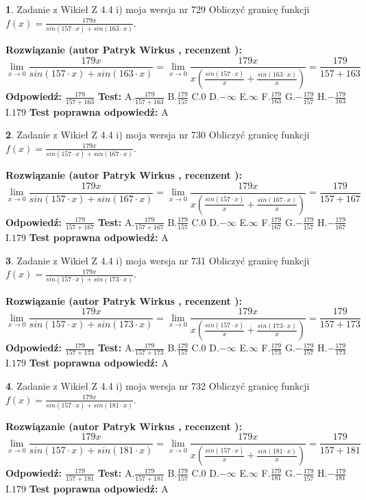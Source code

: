 \documentclass[12pt, a4paper]{article}
\theoremstyle{definition} %
\newtheorem{zad}{}
\newcommand{\zadStart}[1]{\begin{zad}#1\newline}
\newcommand{\zadStop}{\end{zad}}
\newcommand{\rozwStart}[2]{\noindent \textbf{Rozwiązanie (autor #1 , recenzent #2): }\newline}
\newcommand{\rozwStop}{\newline}
\newcommand{\odpStart}{\noindent \textbf{Odpowiedź:}\newline}
\newcommand{\odpStop}{\newline}
\newcommand{\testStart}{\noindent \textbf{Test:}\newline}
\newcommand{\testStop}{\newline}
\newcommand{\kluczStart}{\noindent \textbf{Test poprawna odpowiedź:}\newline}
\newcommand{\kluczStop}{\newline}
\begin{document}
\zadStart{Zadanie z Wikieł Z 4.4 i) moja wersja nr 729}
Obliczyć granicę funkcji $f(x)=\frac{179x}{sin(157\cdot x) +sin(163\cdot x)}$.
\zadStop
\rozwStart{Patryk Wirkus}{}
$$\lim\limits_{x\to 0}\frac{179x}{sin(157\cdot x) +sin(163\cdot x)}=\lim\limits_{x\to 0}\frac{179x}{x(\frac{sin(157\cdot x)}{x}+\frac{sin(163\cdot x)}{x})}=\frac{179}{157+163}$$
\rozwStop
\odpStart
$\frac{179}{157+163}$
\odpStop
\testStart
A.$\frac{179}{157+163}$
B.$\frac{179}{157}$
C.$0$
D.$-\infty$
E.$\infty$
F.$\frac{179}{163}$
G.$-\frac{179}{157}$
H.$-\frac{179}{163}$
I.$179$
\testStop
\kluczStart
A
\kluczStop



\zadStart{Zadanie z Wikieł Z 4.4 i) moja wersja nr 730}
Obliczyć granicę funkcji $f(x)=\frac{179x}{sin(157\cdot x) +sin(167\cdot x)}$.
\zadStop
\rozwStart{Patryk Wirkus}{}
$$\lim\limits_{x\to 0}\frac{179x}{sin(157\cdot x) +sin(167\cdot x)}=\lim\limits_{x\to 0}\frac{179x}{x(\frac{sin(157\cdot x)}{x}+\frac{sin(167\cdot x)}{x})}=\frac{179}{157+167}$$
\rozwStop
\odpStart
$\frac{179}{157+167}$
\odpStop
\testStart
A.$\frac{179}{157+167}$
B.$\frac{179}{157}$
C.$0$
D.$-\infty$
E.$\infty$
F.$\frac{179}{167}$
G.$-\frac{179}{157}$
H.$-\frac{179}{167}$
I.$179$
\testStop
\kluczStart
A
\kluczStop



\zadStart{Zadanie z Wikieł Z 4.4 i) moja wersja nr 731}
Obliczyć granicę funkcji $f(x)=\frac{179x}{sin(157\cdot x) +sin(173\cdot x)}$.
\zadStop
\rozwStart{Patryk Wirkus}{}
$$\lim\limits_{x\to 0}\frac{179x}{sin(157\cdot x) +sin(173\cdot x)}=\lim\limits_{x\to 0}\frac{179x}{x(\frac{sin(157\cdot x)}{x}+\frac{sin(173\cdot x)}{x})}=\frac{179}{157+173}$$
\rozwStop
\odpStart
$\frac{179}{157+173}$
\odpStop
\testStart
A.$\frac{179}{157+173}$
B.$\frac{179}{157}$
C.$0$
D.$-\infty$
E.$\infty$
F.$\frac{179}{173}$
G.$-\frac{179}{157}$
H.$-\frac{179}{173}$
I.$179$
\testStop
\kluczStart
A
\kluczStop



\zadStart{Zadanie z Wikieł Z 4.4 i) moja wersja nr 732}
Obliczyć granicę funkcji $f(x)=\frac{179x}{sin(157\cdot x) +sin(181\cdot x)}$.
\zadStop
\rozwStart{Patryk Wirkus}{}
$$\lim\limits_{x\to 0}\frac{179x}{sin(157\cdot x) +sin(181\cdot x)}=\lim\limits_{x\to 0}\frac{179x}{x(\frac{sin(157\cdot x)}{x}+\frac{sin(181\cdot x)}{x})}=\frac{179}{157+181}$$
\rozwStop
\odpStart
$\frac{179}{157+181}$
\odpStop
\testStart
A.$\frac{179}{157+181}$
B.$\frac{179}{157}$
C.$0$
D.$-\infty$
E.$\infty$
F.$\frac{179}{181}$
G.$-\frac{179}{157}$
H.$-\frac{179}{181}$
I.$179$
\testStop
\kluczStart
A
\kluczStop
\end{document}
